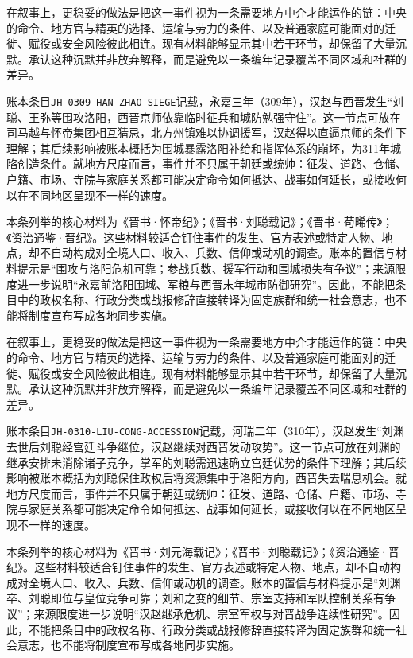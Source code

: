 在叙事上，更稳妥的做法是把这一事件视为一条需要地方中介才能运作的链：中央的命令、地方官与精英的选择、运输与劳力的条件、以及普通家庭可能面对的迁徙、赋役或安全风险彼此相连。现有材料能够显示其中若干环节，却保留了大量沉默。承认这种沉默并非放弃解释，而是避免以一条编年记录覆盖不同区域和社群的差异。

账本条目\texttt{JH-0309-HAN-ZHAO-SIEGE}记载，永嘉三年（309年），汉赵与西晋发生“刘聪、王弥等围攻洛阳，西晋京师依靠临时征兵和城防勉强守住”。这一节点可放在司马越与怀帝集团相互猜忌，北方州镇难以协调援军，汉赵得以直逼京师的条件下理解；其后续影响被账本概括为围城暴露洛阳补给和指挥体系的崩坏，为311年城陷创造条件。就地方尺度而言，事件并不只属于朝廷或统帅：征发、道路、仓储、户籍、市场、寺院与家庭关系都可能决定命令如何抵达、战事如何延长，或接收何以在不同地区呈现不一样的速度。

本条列举的核心材料为《晋书·怀帝纪》；《晋书·刘聪载记》；《晋书·苟晞传》；《资治通鉴·晋纪》。这些材料较适合钉住事件的发生、官方表述或特定人物、地点，却不自动构成对全境人口、收入、兵数、信仰或动机的调查。账本的置信与材料提示是“围攻与洛阳危机可靠；参战兵数、援军行动和围城损失有争议”；来源限度进一步说明“永嘉前洛阳围城、军粮与西晋末年城市防御研究”。因此，不能把条目中的政权名称、行政分类或战报修辞直接转译为固定族群和统一社会意志，也不能将制度宣布写成各地同步实施。

在叙事上，更稳妥的做法是把这一事件视为一条需要地方中介才能运作的链：中央的命令、地方官与精英的选择、运输与劳力的条件、以及普通家庭可能面对的迁徙、赋役或安全风险彼此相连。现有材料能够显示其中若干环节，却保留了大量沉默。承认这种沉默并非放弃解释，而是避免以一条编年记录覆盖不同区域和社群的差异。

账本条目\texttt{JH-0310-LIU-CONG-ACCESSION}记载，河瑞二年（310年），汉赵发生“刘渊去世后刘聪经宫廷斗争继位，汉赵继续对西晋发动攻势”。这一节点可放在刘渊的继承安排未消除诸子竞争，掌军的刘聪需迅速确立宫廷优势的条件下理解；其后续影响被账本概括为刘聪保住政权后将资源集中于洛阳方向，西晋失去喘息机会。就地方尺度而言，事件并不只属于朝廷或统帅：征发、道路、仓储、户籍、市场、寺院与家庭关系都可能决定命令如何抵达、战事如何延长，或接收何以在不同地区呈现不一样的速度。

本条列举的核心材料为《晋书·刘元海载记》；《晋书·刘聪载记》；《资治通鉴·晋纪》。这些材料较适合钉住事件的发生、官方表述或特定人物、地点，却不自动构成对全境人口、收入、兵数、信仰或动机的调查。账本的置信与材料提示是“刘渊卒、刘聪即位与皇位竞争可靠；刘和之变的细节、宗室支持和军队控制关系有争议”；来源限度进一步说明“汉赵继承危机、宗室军权与对晋战争连续性研究”。因此，不能把条目中的政权名称、行政分类或战报修辞直接转译为固定族群和统一社会意志，也不能将制度宣布写成各地同步实施。

